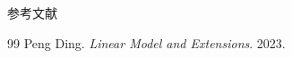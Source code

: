 \documentclass[]{beamer}
\begin{document}
\begin{frame}{参考文献}
\begin{thebibliography}{99}
   Peng Ding. \textit{Linear Model and Extensions}. 2023.
\end{thebibliography}
\end{frame}
\end{document}
